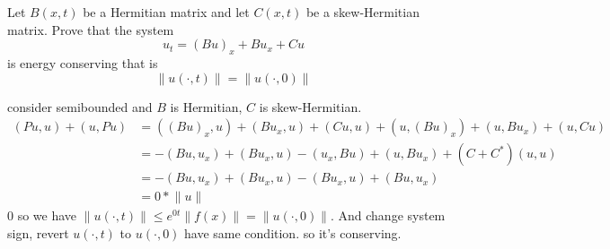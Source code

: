 \exc Let $B(x, t)$ be a Hermitian matrix 
and let $C(x, t)$ be a skew-Hermitian
matrix. Prove that the system
    \[u_t = (Bu)_x + Bu_x +Cu\]
is energy conserving that is 
 \[\lVert u(\cdot, t) \rVert = \lVert u(\cdot, 0) \rVert\]

\begin{solution}
    consider semibounded and $B$ is Hermitian, $C$
    is skew-Hermitian.
    \begin{align*}
        (Pu, u) + (u, Pu) 
        &= ((Bu)_x, u) + (Bu_x, u) + (Cu, u) + 
           (u, (Bu)_x) + (u, Bu_x) + (u, Cu) \\
           &= -(Bu, u_x) + (Bu_x, u) - (u_x, Bu) + (u, Bu_x) 
           + (C + C^*) (u, u) \\
           &= -(Bu, u_x) + (Bu_x, u) - (Bu_x, u) + (Bu, u_x) \\
           &= 0 * \lVert u \rVert
    \end{align*}0
    so we have $\lVert u(\cdot, t) \rVert \leq 
    e ^{0 t} \lVert f(x) \rVert = \lVert u(\cdot, 0) \rVert$.
    And change system sign, revert $u(\cdot, t)$ to $u(\cdot, 0)$
    have same condition. so it's conserving.
\end{solution}